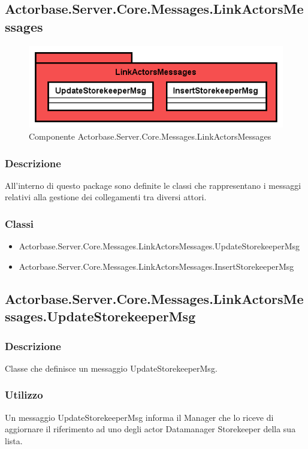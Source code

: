 \documentclass[a4paper]{article}
\begin{document}
			\subsection{Actorbase.Server.Core.Messages.LinkActorsMessages}
			\begin{figure} [H]
			\centering
			\includegraphics[scale=0.65]{Server/Package/LinkActorsMessagesLevel.png}
			\caption{Componente Actorbase.Server.Core.Messages.LinkActorsMessages}
			\end{figure}
			\subsubsection{Descrizione}
				All'interno di questo package sono definite le classi che rappresentano i messaggi relativi alla gestione dei collegamenti tra diversi attori.
			\subsubsection{Classi}
			\begin{itemize}
				\item Actorbase.Server.Core.Messages.LinkActorsMessages.UpdateStorekeeperMsg
				\item Actorbase.Server.Core.Messages.LinkActorsMessages.InsertStorekeeperMsg
			\end{itemize}

			\subsection{Actorbase.Server.Core.Messages.LinkActorsMessages.UpdateStorekeeperMsg}
			\subsubsection{Descrizione}
				Classe che definisce un messaggio UpdateStorekeeperMsg.
			\subsubsection{Utilizzo}
				Un messaggio UpdateStorekeeperMsg informa il Manager che lo riceve di aggiornare il riferimento ad uno degli actor Datamanager Storekeeper della sua lista.
\end{document}
